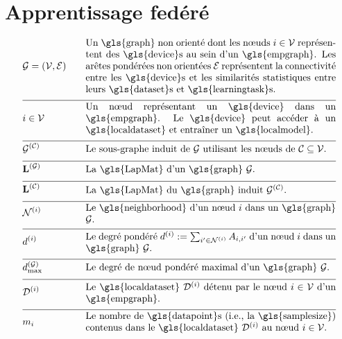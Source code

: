 \newpage
\section*{Apprentissage fedéré}

\begin{align}
	&\graph = \pair{\nodes}{\edges} & \quad & \parbox{.75\textwidth}{Un \gls{graph} non orienté dont les nœuds $\nodeidx \in \nodes$ représentent des \gls{device}s au sein d’un \gls{empgraph}. Les arêtes pondérées non orientées $\edges$ représentent la connectivité entre les \gls{device}s et les similarités statistiques entre leurs \gls{dataset}s et \gls{learningtask}s.} \nonumber \\[2mm] \hline \nonumber\\[-5mm]
	&\nodeidx \in \nodes& \quad & \parbox{.75\textwidth}{Un nœud représentant un \gls{device} dans un \gls{empgraph}. Le \gls{device} peut accéder à un \gls{localdataset} et entraîner un \gls{localmodel}.} \nonumber \\[2mm] \hline \nonumber\\[-5mm]
	&\indsubgraph{\graph}{\cluster}& \quad & \parbox{.75\textwidth}{Le sous-graphe induit de $\graph$ utilisant les nœuds de $\cluster \subseteq \nodes$.} \nonumber \\[2mm] \hline \nonumber\\[-5mm]
	&\LapMat{\graph} & \quad & \parbox{.75\textwidth}{La \gls{LapMat} d’un \gls{graph} $\graph$.} \nonumber \\[2mm] \hline \nonumber\\[-5mm]
	&\LapMat{\cluster} & \quad & \parbox{.75\textwidth}{La \gls{LapMat} du \gls{graph} induit $\indsubgraph{\graph}{\cluster}$.} \nonumber \\[2mm] \hline \nonumber\\[-5mm]
	&\neighbourhood{\nodeidx} & \quad & \parbox{.75\textwidth}{Le \gls{neighborhood} d’un nœud $\nodeidx$ dans un \gls{graph} $\graph$.} \nonumber \\[2mm] \hline \nonumber\\[-5mm]
	&\nodedegree{\nodeidx} & \quad & \parbox{.75\textwidth}{Le degré pondéré $\nodedegree{\nodeidx}\defeq \sum_{\nodeidx' \in \neighbourhood{\nodeidx}} \edgeweight_{\nodeidx,\nodeidx'}$ d’un nœud $\nodeidx$ dans un \gls{graph} $\graph$.} \nonumber \\[2mm] \hline \nonumber\\[-5mm]
	&\maxnodedegree^{(\graph)} & \quad & \parbox{.75\textwidth}{Le degré de nœud pondéré maximal d’un \gls{graph} $\graph$.} \nonumber \\[2mm] \hline \nonumber\\[-5mm]
	&\localdataset{\nodeidx} & \quad & \parbox{.75\textwidth}{Le \gls{localdataset} $\localdataset{\nodeidx}$ détenu par le nœud $\nodeidx\in \nodes$ d’un \gls{empgraph}.} \nonumber \\[2mm] \hline \nonumber\\[-5mm]
	&\localsamplesize{\nodeidx} & \quad & \parbox{.75\textwidth}{Le nombre de \gls{datapoint}s (i.e., la \gls{samplesize}) contenus dans le \gls{localdataset} $\localdataset{\nodeidx}$ au nœud $\nodeidx \in \nodes$.} \nonumber 
\end{align}

